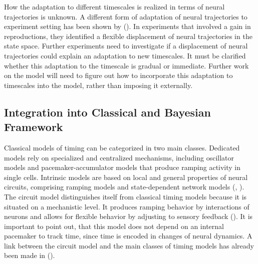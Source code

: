 \documentclass[10pt]{article}
\begin{document}
How the adaptation to different timescales is realized in terms of neural trajectories is unknown. 
A different form of adaptation of neural trajectories to experiment setting has been shown by \citeauthor{Remington2018} (\citeyear{Remington2018}). In experiments that involved a gain in reproductions, they identified a flexible displacement of neural trajectories in the state space.
Further experiments need to investigate if a displacement of neural trajectories could explain an adaptation to new timescales. It must be clarified whether this adaptation to the timescale is gradual or immediate. 
Further work on the model will need to figure out how to incorporate this adaptation to timescales into the model, rather than imposing it externally.

\subsection{Integration into Classical and Bayesian Framework}
Classical models of timing can be categorized in two main classes. 
Dedicated models rely on specialized and centralized mechanisms, including oscillator models and pacemaker-accumulator models that produce ramping activity in single cells.
Intrinsic models are based on local and general properties of neural circuits, comprising ramping models and state-dependent network models (\cite{Goel2014}, \cite{Paton2018}).
The circuit model distinguishes itself from classical timing models because it is situated on a mechanistic level. 
It produces ramping behavior by interactions of neurons and allows for flexible behavior by adjusting to sensory feedback (\cite{Egger2020}).
It is important to point out, that this model does not depend on an internal pacemaker to track time, since time is encoded in changes of neural dynamics.  
A link between the circuit model and the main classes of timing models has already been made in \citeauthor{Egger2020} (\citeyear{Egger2020}).
\end{document}
